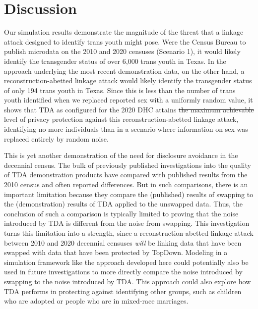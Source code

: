 \documentclass{jpc} %
\theoremstyle{plain}\newtheorem{satz}[thm]{Satz} %
\providecommand{\DIFaddtex}[1]{{\protect\color{blue}\uwave{#1}}} %
\providecommand{\DIFdeltex}[1]{{\protect\color{red}\sout{#1}}}                      %
\providecommand{\DIFaddbegin}{} %
\providecommand{\DIFaddend}{} %
\providecommand{\DIFdelbegin}{} %
\providecommand{\DIFdelend}{} %
\providecommand{\DIFadd}[1]{\texorpdfstring{\DIFaddtex{#1}}{#1}} %
\providecommand{\DIFdel}[1]{\texorpdfstring{\DIFdeltex{#1}}{}} %
\begin{document}
\section{Discussion}

    Our simulation results demonstrate the magnitude of the threat that a linkage attack designed to identify trans youth might pose.  Were the Census Bureau to publish microdata on the 2010 and 2020 censuses (Scenario 1), it would likely identify the transgender status of over 6,000 trans youth in Texas.  In the approach underlying the most recent demonstration data, on the other hand, a reconstruction-abetted linkage attack would likely identify the transgender status of only 194 trans youth in Texas.  Since this is less than the number of trans youth identified when we replaced reported sex with a uniformly random value, it shows that TDA as configured for the 2020 DHC attains \DIFdelbegin \DIFdel{the maximum achievable }\DIFdelend \DIFaddbegin \DIFadd{our baseline maximum }\DIFaddend level of privacy protection against this reconstruction-abetted linkage attack, identifying no more individuals than in a scenario where information on sex was replaced entirely by random noise.

This is yet another demonstration of the need for disclosure avoidance in the decennial census.  The bulk of previously published investigations into the quality of TDA demonstration products have compared with published results from the 2010 census and often reported differences.  But in such comparisons, there is an important limitation because they compare the (published) results of swapping to the (demonstration) results of TDA applied to the unswapped data.  Thus, the conclusion of such a comparison is typically limited to proving that the noise introduced by TDA is different from the noise from swapping.
This investigation turns this limitation into a strength, since a reconstruction-abetted linkage attack between 2010 and 2020 decennial censuses \emph{will} be linking data that have been swapped with data that have been protected by TopDown.
Modeling in a simulation framework like the approach developed here could potentially also be used in future investigations to more directly compare the noise introduced by swapping to the noise introduced by TDA.  This approach could also explore how TDA performs in protecting against identifying other groups, such as children who are adopted or people who are in mixed-race marriages.
\end{document}
